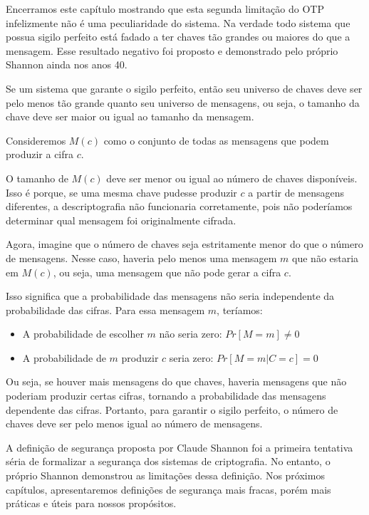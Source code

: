 Encerramos este capítulo mostrando que esta segunda limitação do OTP infelizmente não é uma peculiaridade do sistema.
Na verdade todo sistema que possua sigilo perfeito está fadado a ter chaves tão grandes ou maiores do que a mensagem.
Esse resultado negativo foi proposto e demonstrado pelo próprio Shannon ainda nos anos 40.


\begin{theorem}[Shannon]
Se um sistema que garante o sigilo perfeito, então seu universo de chaves deve ser pelo menos tão grande quanto seu universo de mensagens, ou seja, o tamanho da chave deve ser maior ou igual ao tamanho da mensagem.
\end{theorem}

Consideremos $M(c)$ como o conjunto de todas as mensagens que podem produzir a cifra $c$.

O tamanho de $M(c)$ deve ser menor ou igual ao número de chaves disponíveis.
Isso é porque, se uma mesma chave pudesse produzir $c$ a partir de mensagens diferentes, a descriptografia não funcionaria corretamente, pois não poderíamos determinar qual mensagem foi originalmente cifrada.

Agora, imagine que o número de chaves seja estritamente menor do que o número de mensagens.
Nesse caso, haveria pelo menos uma mensagem $m$ que não estaria em $M(c)$, ou seja, uma mensagem que não pode gerar a cifra $c$.

Isso significa que a probabilidade das mensagens não seria independente da probabilidade das cifras. Para essa mensagem $m$, teríamos:
\begin{itemize}
\item A probabilidade de escolher $m$ não seria zero: $Pr[M = m] \neq 0$
\item A probabilidade de $m$ produzir $c$ seria zero: $Pr[M = m | C = c] = 0$
\end{itemize}

Ou seja, se houver mais mensagens do que chaves, haveria mensagens que não poderiam produzir certas cifras, tornando a probabilidade das mensagens dependente das cifras.
Portanto, para garantir o sigilo perfeito, o número de chaves deve ser pelo menos igual ao número de mensagens.

A definição de segurança proposta por Claude Shannon foi a primeira tentativa séria de formalizar a segurança dos sistemas de criptografia.
No entanto, o próprio Shannon demonstrou as limitações dessa definição.
Nos próximos capítulos, apresentaremos definições de segurança mais fracas, porém mais práticas e úteis para nossos propósitos.

